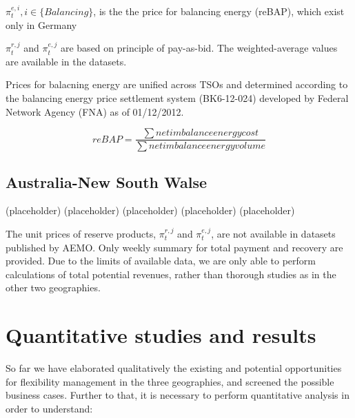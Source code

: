 $\pi_t^{e,i}, i \in \{Balancing\}$, is the the price for balancing energy (reBAP), which exist only in Germany

$\pi_t^{r,j}$ and $\pi_t^{e,j}$ are based on principle of pay-as-bid. The weighted-average values are available in the datasets.



Prices for balacning energy are unified across TSOs and determined according to the  balancing energy price settlement system (BK6-12-024) developed by Federal Network Agency (FNA) as of 01/12/2012.

\begin{equation}
\label{eq:reBAP}
reBAP = \frac{\sum net imbalance energy cost}{\sum net imbalance energy volume}
\end{equation}

\subsection{Australia-New South Walse}
(placeholder)
\newpage
(placeholder)
\newpage
(placeholder)
\newpage
(placeholder)
\newpage
(placeholder)
\newpage

The unit prices of reserve products, $\pi_t^{r,j}$ and $\pi_t^{e,j}$, are not available in datasets published by AEMO. Only weekly summary for total payment and recovery are provided. Due to the limits of available data, we are only able to perform calculations of total potential revenues, rather than thorough studies as in the other two geographies.

\newpage

\section{Quantitative studies and results}
So far we have elaborated qualitatively the existing and potential opportunities for flexibility management in the three geographies, and screened the possible business cases. Further to that, it is necessary to perform quantitative analysis in order to understand:

